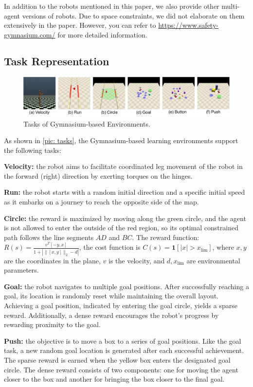\documentclass{article}
\begin{document}
In addition to the robots mentioned in this paper, we also provide other multi-agent versions of robots. Due to space constraints, we did not elaborate on them extensively in the paper. However, you can refer to \url{https://www.safety-gymnasium.com/} for more detailed information.

\subsection{Task Representation}
\begin{figure}[H]
  \centering
  \includegraphics[width=\linewidth]{assets/appendix/app-task.pdf}
  \caption{Tasks of Gymnasium-based Environments.}
  \label{pic: tasks}
\end{figure}

As shown in \autoref{pic: tasks}, the Gymnasium-based learning environments support the following tasks:

\textbf{Velocity:} the robot aims to facilitate coordinated leg movement of the robot in the forward (right) direction by exerting torques on the hinges.

\textbf{Run:} the robot starts with a random initial direction and a specific initial speed as it embarks on a journey to reach the opposite side of the map.

\textbf{Circle:} the reward is maximized by moving along the green circle, and the agent is not allowed to enter the outside of the red region, so its optimal constrained path follows the line segments $AD$ and $BC$. The reward function: $R(s) =\frac{v^T[-y, x]}{1+\left|\|[x, y]\|_2-d\right|}$, the cost function is $C(s) =\mathbf{1}\left[|x|>x_{\mathrm{lim}}\right]$, where $x,y$ are the coordinates in the plane, $v$ is the velocity, and $d, x_{\mathrm{lim}}$ are environmental parameters.


\textbf{Goal:} the robot navigates to multiple goal positions. After successfully reaching a goal, its location is randomly reset while maintaining the overall layout. Achieving a goal position, indicated by entering the goal circle, yields a sparse reward. Additionally, a dense reward encourages the robot's progress by rewarding proximity to the goal.

\textbf{Push:} the objective is to move a box to a series of goal positions. Like the goal task, a new random goal location is generated after each successful achievement. The sparse reward is earned when the yellow box enters the designated goal circle. The dense reward consists of two components: one for moving the agent closer to the box and another for bringing the box closer to the final goal.
\end{document}
